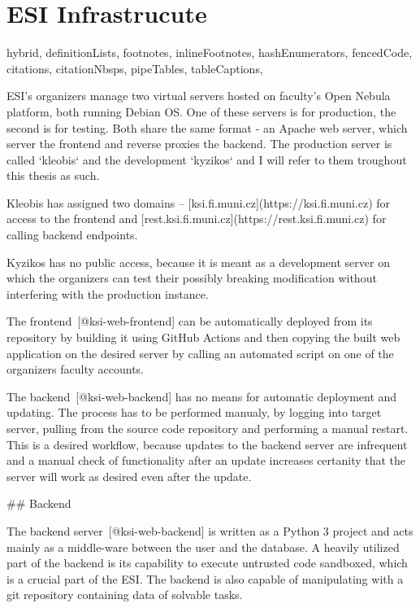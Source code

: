 \documentclass[
  digital, %
  oneside, %
  lof,     %
  lot,     %
]{fithesis4}
\begin{document}
\chapter{ESI Infrastrucute}
\shorthandoff{-}
\begin{markdown*}{%
  hybrid,
  definitionLists,
  footnotes,
  inlineFootnotes,
  hashEnumerators,
  fencedCode,
  citations,
  citationNbsps,
  pipeTables,
  tableCaptions,
}

ESI's organizers manage two virtual servers hosted on faculty's Open Nebula platform, both running Debian OS. One of these servers is for production, the second is for testing. Both share the same format - an Apache web server, which server the frontend and reverse proxies the backend.
The production server is called `kleobis` and the development `kyzikos` and I will refer to them troughout this thesis as such.

Kleobis has assigned two domains -- [ksi.fi.muni.cz](https://ksi.fi.muni.cz) for access to the frontend and [rest.ksi.fi.muni.cz](https://rest.ksi.fi.muni.cz) for calling backend endpoints.

Kyzikos has no public access, because it is meant as a development server on which the organizers can test their possibly breaking modification without interfering with the production instance.

The frontend~[@ksi-web-frontend] can be automatically deployed from its repository by building it using GitHub Actions and then copying the built web application on the desired server by calling an automated script on one of the organizers faculty accounts.

The backend~[@ksi-web-backend] has no means for automatic deployment and updating. The process has to be performed manualy, by logging into target server, pulling from the source code repository and performing a manual restart. This is a desired workflow, because updates to the backend server are infrequent and a manual check of functionality after an update increases certanity that the server will work as desired even after the update.

## Backend

The backend server~[@ksi-web-backend] is written as a Python 3 project and acts mainly as a middle-ware between the user and the database. A heavily utilized part of the backend is its capability to execute untrusted code sandboxed, which is a crucial part of the ESI. The backend is also capable of manipulating with a git repository containing data of solvable tasks.


\end{markdown*}
\end{document}
